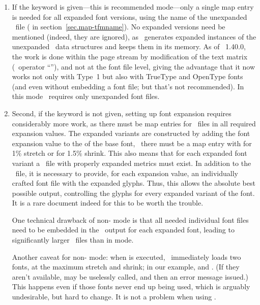 \documentclass{pdftexmanual}
\begin{document}
\begin{enumerate}
\item If the  keyword is given---this is
recommended mode---only a single map entry is needed for all expanded
font versions, using the name of the unexpanded \TFM\ file
( in section~\ref{sec.map-tfmname}). No expanded
 versions need be mentioned (indeed, they are ignored),
as \PDFTEX\ generates expanded instances of the unexpanded \TFM\ data
structures and keeps them in its memory. As of \PDFTEX~1.40.0, the
 work is done within the page stream by modification of
the text matrix (\PDF\ operator ``''), and not at the font file
level, giving the advantage that it now works not only with Type~1 but
also with TrueType and OpenType fonts (and even without embedding a font
file; but that's not recommended). In this mode \PDFTEX\ requires only
unexpanded font files.

\item Second, if the  keyword is not given, setting up
font expansion requires considerably more work, as there must be map
entries for \TFM\ files in all required expansion values. The expanded
 variants are constructed by adding the font expansion
value to the  of the base font, \eg\ there must be a
map entry with   for 1\% stretch or
 for 1.5\% shrink. This also means that for each
expanded font variant a \TFM\ file with properly expanded metrics must
exist. In addition to the \TFM\ file, it is necessary to provide, for
each expansion value, an individually crafted font file with the
expanded glyphs. Thus, this allows the absolute best possible output,
controlling the glyphs for every expanded variant of the font. It is a
rare document indeed for this to be worth the trouble.

One technical drawback of non- mode is that all needed
individual font files need to be embedded in the \PDF\ output for each
expanded font, leading to significantly larger \PDF\ files than in
 mode.

Another caveat for non- mode: when 
is executed, \PDFTEX\ immediately loads two fonts, at the maximum
stretch and shrink; in our example,  and
. (If they aren't available,  may be
uselessly called, and then an error message issued.) This happens even
if those fonts never end up being used, which is arguably undesirable,
but hard to change. It is not a problem when using .
\end{enumerate}
\end{document}
